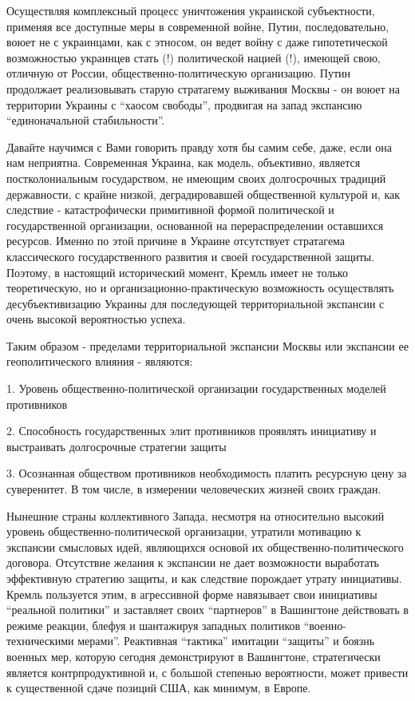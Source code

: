 Осуществляя комплексный процесс уничтожения украинской субъектности, применяя
все доступные меры в современной войне, Путин, последовательно, воюет не с
украинцами, как с этносом, он ведет войну с даже гипотетической возможностью
украинцев стать (!) политической нацией (!), имеющей свою, отличную от России,
общественно-политическую организацию. Путин продолжает реализовывать старую
стратагему выживания Москвы - он воюет на территории Украины с \enquote{хаосом
свободы}, продвигая на запад экспансию \enquote{единоначальной стабильности}.

Давайте научимся с Вами говорить правду хотя бы самим себе, даже, если она нам
неприятна. Современная Украина, как модель, объективно, является
постколониальным государством, не имеющим своих долгосрочных традиций
державности, с крайне низкой, деградировавшей общественной культурой и, как
следствие - катастрофически примитивной формой политической и государственной
организации, основанной на перераспределении оставшихся ресурсов. Именно по
этой причине в Украине отсутствует стратагема классического государственного
развития и своей государственной защиты. Поэтому, в настоящий исторический
момент, Кремль имеет не только теоретическую, но и организационно-практическую
возможность осуществлять десубъективизацию Украины для последующей
территориальной экспансии с очень высокой вероятностью успеха.

Таким образом - пределами территориальной экспансии Москвы или экспансии ее
геополитического влияния - являются:

1. Уровень общественно-политической организации государственных моделей
противников

2. Способность государственных элит противников проявлять инициативу и
выстраивать долгосрочные стратегии защиты

3. Осознанная обществом противников необходимость платить ресурсную цену за
суверенитет. В том числе, в измерении человеческих жизней своих граждан.

Нынешние страны коллективного Запада, несмотря на относительно высокий уровень
общественно-политической организации, утратили мотивацию к экспансии смысловых
идей, являющихся основой их общественно-политического договора. Отсутствие
желания к экспансии не дает возможности выработать эффективную стратегию
защиты, и как следствие порождает утрату инициативы. Кремль пользуется этим, в
агрессивной форме навязывает свои инициативы \enquote{реальной политики} и
заставляет своих \enquote{партнеров} в Вашингтоне действовать в режиме реакции,
блефуя и шантажируя западных политиков \enquote{военно-техническими мерами}.
Реактивная \enquote{тактика} имитации \enquote{защиты} и боязнь военных мер,
которую сегодня демонстрируют в Вашингтоне, стратегически является
контрпродуктивной и, с большой степенью вероятности, может привести к
существенной сдаче позиций США, как минимум, в Европе.
